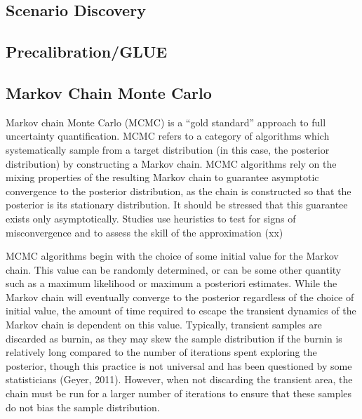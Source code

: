 \documentclass[letterpaper,10pt,english]{sphinxmanual}
\begin{document}
\subsection{Scenario Discovery}
\label{\detokenize{6_uncertainty_quantification_a_tool_for_capturing_risks_and_extremes:scenario-discovery}}

\subsection{Pre\sphinxhyphen{}calibration/GLUE}
\label{\detokenize{6_uncertainty_quantification_a_tool_for_capturing_risks_and_extremes:pre-calibration-glue}}

\subsection{Markov Chain Monte Carlo}
\label{\detokenize{6_uncertainty_quantification_a_tool_for_capturing_risks_and_extremes:markov-chain-monte-carlo}}
\sphinxAtStartPar
Markov chain Monte Carlo (MCMC) is a “gold standard” approach to full uncertainty quantification. MCMC refers to a category of algorithms which systematically sample from a target distribution (in this case, the posterior distribution) by constructing a Markov chain. MCMC algorithms rely on the mixing properties of the resulting Markov chain to guarantee asymptotic convergence to the posterior distribution, as the chain is constructed so that the posterior is its stationary distribution. It should be stressed that this guarantee exists only asymptotically. Studies use heuristics to test for signs of misconvergence and to assess the skill of the approximation (xx)

\sphinxAtStartPar
MCMC algorithms begin with the choice of some initial value for the Markov chain. This value can be randomly determined, or can be some other quantity such as a maximum likelihood or maximum a posteriori estimates. While the Markov chain will eventually converge to the posterior regardless of the choice of initial value, the amount of time required to escape the transient dynamics of the Markov chain is dependent on this value. Typically, transient samples are discarded as burn\sphinxhyphen{}in, as they may skew the sample distribution if the burn\sphinxhyphen{}in is relatively long compared to the number of iterations spent exploring the posterior, though this practice is not universal and has been questioned by some statisticians (Geyer, 2011). However, when not discarding the transient area, the chain must be run for a larger number of iterations to ensure that these samples do not bias the sample distribution.
\end{document}
